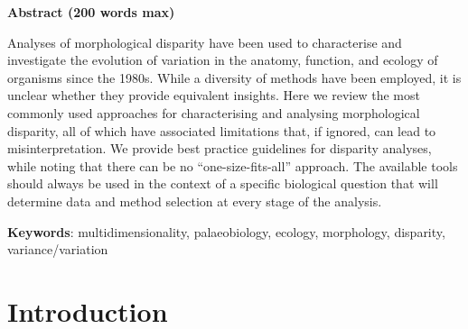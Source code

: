 \documentclass[12pt,letterpaper]{article}
\begin{document}
\modulolinenumbers[1]
\linenumbers

\textbf{Abstract (200 words max)}

\noindent Analyses of morphological disparity have been used to characterise and investigate the evolution of variation in the anatomy, function, and ecology of organisms since the 1980s.
While a diversity of methods have been employed, it is unclear whether they provide equivalent insights.
Here we review the most commonly used approaches for characterising and analysing morphological disparity, all of which have associated limitations that, if ignored, can lead to misinterpretation.
We provide best practice guidelines for disparity analyses, while noting that there can be no ``one-size-fits-all'' approach.
The available tools should always be used in the context of a specific biological question that will determine data and method selection at every stage of the analysis.
 
\textbf{Keywords}: multidimensionality, palaeobiology, ecology, morphology, disparity, variance/variation

\section{Introduction}
\end{document}
